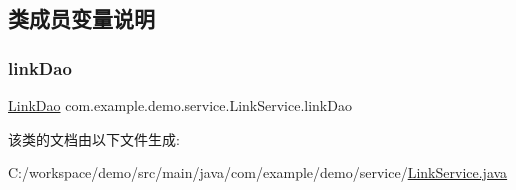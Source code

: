 \subsection{类成员变量说明}
\mbox{\label{classcom_1_1example_1_1demo_1_1service_1_1_link_service_a3b92ee611c7d2b22f94b7f1b2b2bcf47}} 
\subsubsection{\texorpdfstring{link\+Dao}{linkDao}}
{\footnotesize\ttfamily \mbox{\hyperlink{interfacecom_1_1example_1_1demo_1_1dao_1_1_link_dao}{Link\+Dao}} com.\+example.\+demo.\+service.\+Link\+Service.\+link\+Dao\hspace{0.3cm}{\ttfamily [package]}}



该类的文档由以下文件生成\+:\begin{DoxyCompactItemize}
\item 
C\+:/workspace/demo/src/main/java/com/example/demo/service/\mbox{\hyperlink{_link_service_8java}{Link\+Service.\+java}}\end{DoxyCompactItemize}
